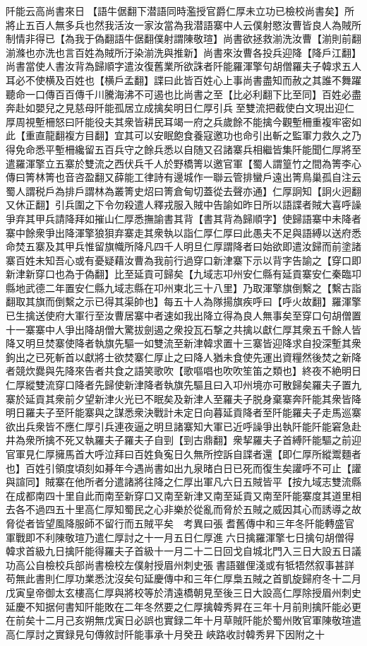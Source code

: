 阡能云高尚書來日【語牛倨翻下潜語同時濫授官爵仁厚未立功已檢校尚書矣】所將止五百人無多兵也然我活汝一家汝當為我潜語寨中人云僕射愍汝曹皆良人為賊所制情非得已【為我于偽翻語牛倨翻僕射謂陳敬瑄】尚書欲拯救湔洗汝曹【湔則前翻湔滌也亦洗也言百姓為賊所汙染湔洗與推新】尚書來汝曹各投兵迎降【降戶江翻】尚書當使人書汝背為歸順字遣汝復舊業所欲誅者阡能羅渾擎句胡僧羅夫子韓求五人耳必不使横及百姓也【横戶孟翻】諜曰此皆百姓心上事尚書盡知而赦之其誰不舞躍聽命一口傳百百傳千川騰海沸不可遏也比尚書之至【比必利翻下比至同】百姓必盡奔赴如嬰兒之見慈母阡能孤居立成擒矣明日仁厚引兵至雙流把截使白文現出迎仁厚周視塹柵怒曰阡能役夫其衆皆耕民耳竭一府之兵歲餘不能擒今觀塹柵重複牢密如此【重直龍翻複方目翻】宜其可以安眠飽食養寇邀功也命引出斬之監軍力救久之乃得免命悉平塹柵纔留五百兵守之餘兵悉以自随又召諸寨兵相繼皆集阡能聞仁厚將至遣羅渾擎立五寨於雙流之西伏兵千人於野橋箐以邀官軍【蜀人謂篁竹之間為箐李心傳曰箐林箐也音咨盈翻又薛能工律詩有邊城作一聯云管排蠻戶遠出箐鳥巢孤自注云蜀人謂税戶為排戶謂林為叢箐史炤曰箐倉甸切蓋從去聲亦通】仁厚詗知【詗火迥翻又休正翻】引兵圍之下令勿殺遣人釋戎服入賊中告諭如昨日所以語諜者賊大喜呼譟爭弃其甲兵請降拜如摧山仁厚悉撫諭書其背【書其背為歸順字】使歸語寨中未降者寨中餘衆爭出降渾擎狼狽弃寨走其衆執以詣仁厚仁厚曰此愚夫不足與語縛以送府悉命焚五寨及其甲兵惟留旗幟所降凡四千人明旦仁厚謂降者曰始欲即遣汝歸而前塗諸寨百姓未知吾心或有憂疑藉汝曹為我前行過穿口新津寨下示以背字告諭之【穿口即新津新穿口也為于偽翻】比至延貢可歸矣【九域志卭州安仁縣有延貢寨安仁秦臨卭縣地武德二年置安仁縣九域志縣在卭州東北三十八里】乃取渾擎旗倒繫之【繫古詣翻取其旗而倒繫之示已得其渠帥也】每五十人為隊揚旗疾呼曰【呼火故翻】羅渾擎已生擒送使府大軍行至汝曹居寨中者速如我出降立得為良人無事矣至穿口句胡僧置十一寨寨中人爭出降胡僧大驚拔劍遏之衆投瓦石撃之共擒以獻仁厚其衆五千餘人皆降又明旦焚寨使降者執旗先驅一如雙流至新津韓求置十三寨皆迎降求自投深塹其衆鉤出之已死斬首以獻將士欲焚寨仁厚止之曰降人猶未食使先運出資糧然後焚之新降者競炊爨與先降來告者共食之語笑歌吹【歌嘔唱也吹吹笙笛之類也】終夜不絶明日仁厚縱雙流穿口降者先歸使新津降者執旗先驅且曰入卭州境亦可散歸矣羅夫子置九寨於延貢其衆前夕望新津火光已不眠矣及新津人至羅夫子脱身棄寨奔阡能其衆皆降明日羅夫子至阡能寨與之謀悉衆決戰計未定日向暮延貢降者至阡能羅夫子走馬巡寨欲出兵衆皆不應仁厚引兵連夜逼之明旦諸寨知大軍已近呼譟爭出執阡能阡能窘急赴井為衆所擒不死又執羅夫子羅夫子自剄【剄古鼎翻】衆挈羅夫子首縛阡能驅之前迎官軍見仁厚擁馬首大呼泣拜曰百姓負寃日久無所控訴自諜者還【即仁厚所縱鬻麵者也】百姓引領度頃刻如朞年今遇尚書如出九泉暏白日已死而復生矣讙呼不可止【讙與諠同】賊寨在他所者分遣諸將往降之仁厚出軍凡六日五賊皆平【按九域志雙流縣在成都南四十里自此而南至新穿口又南至新津又南至延貢又南至阡能寨度其道里相去各不過四五十里高仁厚知蜀民之心非樂於從亂而脅於五賊之威因其心而誘導之故脅從者皆望風降服師不留行而五賊平矣　考異曰張耆舊傳中和三年冬阡能轉盛官軍戰即不利陳敬瑄乃遣仁厚討之十一月五日仁厚進六日擒羅渾擎七日擒句胡僧得韓求首級九日擒阡能得羅夫子首級十一月二十二日回戈自城北門入三日大設五日議功高公自檢校兵部尚書檢校左僕射授眉州刺史張書語雖俚淺或有牴牾然叙事甚詳苟無此書則仁厚功業悉沈沒矣句延慶傳中和三年仁厚梟五賊之首凱旋歸府冬十二月戊寅皇帝御太玄樓高仁厚與將校等於清遠橋朝見至後三日大設高仁厚除授眉州刺史延慶不知据何書知阡能敗在二年冬然要之仁厚擒韓秀昇在三年十月前則擒阡能必更在前矣十二月己亥朔無戊寅日必誤也實録二年十月草賊阡能於蜀州敗官軍陳敬瑄遣高仁厚討之實録見句傳敘討阡能事承十月癸丑峽路收討韓秀昇下因附之十